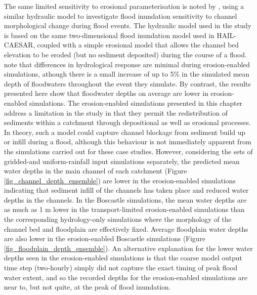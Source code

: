 The same limited sensitivity to erosional parameterisation is noted by \citep{wong2015sensitivity}, using a similar hydraulic model to investigate flood inundation sensitivity to channel morphological change during flood events. The hydraulic model used in the \citet{wong2015sensitivity} study is based on the same two-dimensional flood inundation model used in HAIL-CAESAR, coupled with a simple erosional model that allows the channel bed elevation to be eroded (but no sediment deposited) during the course of a flood. \citet{wong2015sensitivity} note that differences in hydrological response are minimal during erosion-enabled simulations, athough there is a small increase of up to 5\% in the simulated mean depth of floodwaters throughout the event they simulate. By contrast, the results presented here show that floodwater depths on average are lower in erosion-enabled simulations. The erosion-enabled simulations presented in this chapter address a limitation in the \citet{wong2015sensitivity} study in that they permit the redistribution of sediments within a catchment through depositional as well as erosional processes.  In theory, such a model could capture channel blockage from sediment build up or infill during a flood, although this behaviour is not immediately apparent from the simulations carried out for these case studies. However, considering the sets of gridded-and uniform-rainfall input simulations separately, the predicted mean water depths in the main channel of each catchment (Figure \ref{fig_channel_depth_ensemble}) are lower in the erosion-enabled simulations indicating that sediment infill of the channels has taken place and reduced water depths in the channels. In the Boscastle simulations, the mean water depths are as much as 1 m lower in the transport-limited erosion-enabled simulations than the corresponding hydrology-only simulations where the morphology of the channel bed and floodplain are effectively fixed. Average floodplain water depths are also lower in the erosion-enabled Boscastle simulations (Figure \ref{fig_floodplain_depth_ensemble}). An alternative explanation for the lower water depths seen in the erosion-enabled simulations is that the coarse model output time step (two-hourly) simply did not capture the exact timing of peak flood water extent, and so the recorded depths for the erosion-enabled simulations are near to, but not quite, at the peak of flood inundation.

